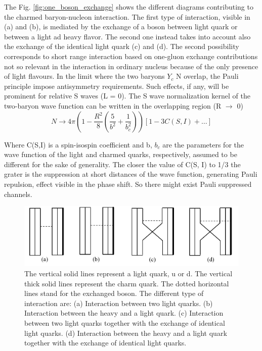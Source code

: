 \documentclass[12pt,a4paper]{book}
\begin{document}
	The Fig. \ref{fig:one_boson_exchange} shows the different diagrams contributing to the charmed baryon-nucleon interaction. The first type of interaction, visible in (a) and (b), is mediated by the exchange of a boson between light quark or between a light ad heavy flavor. The second one instead takes into account also the exchange of the identical light quark (c) and (d). The second possibility corresponds to short range interaction based on one-gluon exchange contributions not so relevant in the interaction in ordinary nucleus because of the only presence of light flavours. In the limit where the two baryons $Y_c$ N overlap, the Pauli principle impose antisymmetry requirements. Such effects, if any, will be	prominent for relative S waves (L = 0).
	The S wave normalization kernel of the two-baryon wave function can be written in the overlapping region (R $\rightarrow$ 0)
	\begin{equation}
		N \rightarrow  4 \pi \left( 1 - \frac{R^2}{8} \left( \frac{5}{b^2} + \frac{1}{b_c^2} \right) \right) \left[ 1 - 3C(S,I) + \dots \right]
	\end{equation}
	
	Where C(S,I) is a spin-isospin coefficient and b, $b_c$ are the parameters for the wave function of the light and charmed quarks, respectively, assumed to be different for the
	sake of generality. The closer the value of C(S, I) to 1/3 the grater is  the suppression at short distances of the wave function, generating Pauli repulsion, effect visible in the phase shift. So there might exist Pauli suppressed channels. 
	
	\begin{figure}[ht]
		\centering
		\includegraphics[width=0.7\linewidth]{pictures/charmed_nucleos_interaction.png}
		\caption{ The vertical solid lines represent a light quark, u or d. The vertical thick solid lines represent the charm quark. The dotted horizontal lines stand for the exchanged boson. The different type of interaction are: (a) Interaction between two light quarks. (b) Interaction between the heavy and a light quark. (c) Interaction between	two light quarks together with the exchange of identical light quarks. (d) Interaction between the	heavy and a light quark together with the exchange of identical light quarks.}
		\label{fig:charmed_nucleos_interaction} 
	\end{figure}
	
\end{document}
